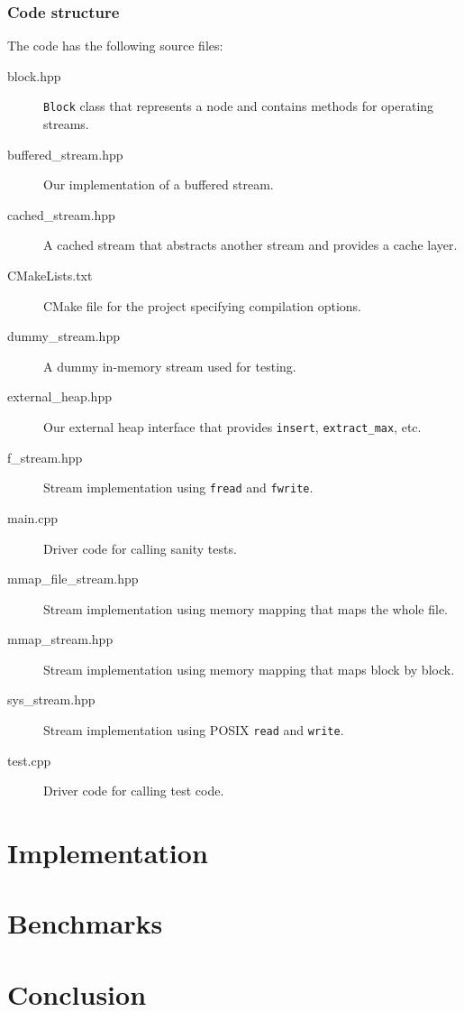 \documentclass[a4paper,12pt]{article}
\begin{document}
\subsubsection{Code structure}
The code has the following source files:
\begin{description}


\item[block.hpp] \texttt{Block} class that represents a node and contains methods for operating streams.

\item[buffered\_stream.hpp] Our implementation of a buffered stream.

\item[cached\_stream.hpp] A cached stream that abstracts another stream and provides a cache layer.

\item[CMakeLists.txt] CMake file for the project specifying
  compilation options.

\item[dummy\_stream.hpp] A dummy in-memory stream used for testing.

\item[external\_heap.hpp] Our external heap interface that provides \texttt{insert}, \texttt{extract\_max}, etc.

\item[f\_stream.hpp] Stream implementation using \texttt{fread} and \texttt{fwrite}.

\item[main.cpp] Driver code for calling sanity tests.

\item[mmap\_file\_stream.hpp] Stream implementation using memory mapping that maps the whole file.

\item[mmap\_stream.hpp] Stream implementation using memory mapping that maps block by block.

\item[sys\_stream.hpp] Stream implementation using POSIX \texttt{read} and \texttt{write}.

\item[test.cpp] Driver code for calling test code.

\end{description}

\section{Implementation}


\section{Benchmarks}


\section{Conclusion}



\end{document}
